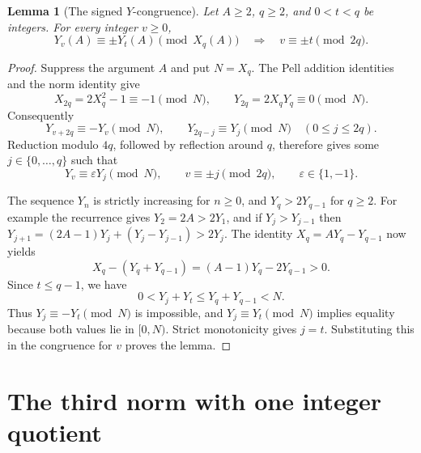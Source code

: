 \documentclass[11pt]{article}
\newtheorem{lemma}[theorem]{Lemma}
\begin{document}
\begin{lemma}[The signed \(Y\)-congruence]\label{Ylemma}
Let \(A\ge2\), \(q\ge2\), and \(0<t<q\) be integers. For
every integer \(v\ge0\),
\[
 Y_v(A)\equiv\pm Y_t(A)\pmod{X_q(A)}
 \quad\Longrightarrow\quad
 v\equiv\pm t\pmod{2q}.
\]
\end{lemma}
\begin{proof}
Suppress the argument \(A\) and put \(N=X_q\). The Pell addition
identities and the norm identity give
\[
 X_{2q}=2X_q^2-1\equiv-1\pmod N,
 \qquad Y_{2q}=2X_qY_q\equiv0\pmod N.
\]
Consequently
\[
 Y_{v+2q}\equiv-Y_v\pmod N,
 \qquad Y_{2q-j}\equiv Y_j\pmod N\quad(0\le j\le2q).
\]
Reduction modulo \(4q\), followed by reflection around \(q\),
therefore gives some \(j\in\{0,\ldots,q\}\) such that
\[
 Y_v\equiv\varepsilon Y_j\pmod N,
 \qquad v\equiv\pm j\pmod{2q},\qquad\varepsilon\in\{1,-1\}.
\]

The sequence \(Y_n\) is strictly increasing for \(n\ge0\), and
\(Y_q>2Y_{q-1}\) for \(q\ge2\). For example the recurrence
gives \(Y_2=2A>2Y_1\), and if \(Y_j>Y_{j-1}\) then
\(Y_{j+1}=(2A-1)Y_j+(Y_j-Y_{j-1})>2Y_j\).
The identity \(X_q=AY_q-Y_{q-1}\) now yields
\[
 X_q-(Y_q+Y_{q-1})=(A-1)Y_q-2Y_{q-1}>0.
\]
Since \(t\le q-1\), we have
\[
 0<Y_j+Y_t\le Y_q+Y_{q-1}<N.
\]
Thus \(Y_j\equiv-Y_t\pmod N\) is impossible, and
\(Y_j\equiv Y_t\pmod N\) implies equality because both values
lie in \([0,N)\). Strict monotonicity gives \(j=t\). Substituting
this in the congruence for \(v\) proves the lemma.
\end{proof}

\section{The third norm with one integer quotient}
\end{document}

